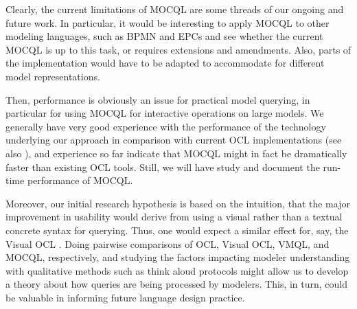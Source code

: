 \documentclass{llncs}
\newcommand{\MMQ}{MOCQL\xspace}
\begin{document}
Clearly, the current limitations of \MMQ are some threads of our ongoing and future work. In particular, it would be interesting to apply \MMQ to other modeling languages, such as BPMN and EPCs and see whether the current \MMQ is up to this task, or requires extensions and amendments. Also, parts of the implementation would have to be adapted to accommodate for different model representations.

Then, performance is obviously an issue for practical model querying, in particular for using \MMQ for interactive operations on large models. We generally have very good experience with the performance of the technology underlying our approach in comparison with current OCL implementations (see also \cite{opoka:etal:comparison}), and experience so far indicate that \MMQ might in fact be dramatically faster than existing OCL tools. Still, we will have study and document the run-time performance of \MMQ.

Moreover, our initial research hypothesis is based on the intuition, that the major improvement in usability would derive from using a visual rather than a textual concrete syntax for querying. Thus, one would expect a similar effect for, say, the Visual OCL \cite{bottoni:etal:consistency,bottoni:etal:visualisation}. Doing pairwise comparisons of OCL, Visual OCL, VMQL, and \MMQ, respectively, and studying the factors impacting modeler understanding with qualitative methods such as think aloud protocols might allow us to develop a theory about how queries are being processed by modelers. This, in turn, could be valuable in informing future language design practice.



\end{document}
